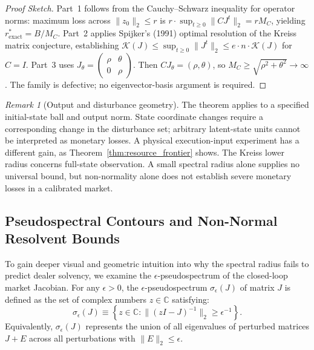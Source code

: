 \documentclass[12pt]{article}
\theoremstyle{definition}
\theoremstyle{remark}
\newtheorem{remark}[theorem]{Remark}
\begin{document}
\begin{proof}[Proof Sketch]
Part~1 follows from the Cauchy--Schwarz inequality for operator norms: maximum loss across $\|z_0\|_2 \le r$ is $r \cdot \sup_{t \ge 0} \|C J^t\|_2 = r M_C$, yielding $r^*_{\text{exact}} = B/M_C$. Part~2 applies Spijker's (1991) optimal resolution of the Kreiss matrix conjecture, establishing $\mathcal{K}(J) \le \sup_{t \ge 0} \|J^t\|_2 \le e \cdot n \cdot \mathcal{K}(J)$ for $C=I$. Part~3 uses $J_\theta=\left(\begin{smallmatrix}\rho&\theta\\0&\rho\end{smallmatrix}\right)$. Then $CJ_\theta=(\rho,\theta)$, so $M_C\ge\sqrt{\rho^2+\theta^2}\to\infty$. The family is defective; no eigenvector-basis argument is required.
\end{proof}

\begin{remark}[Output and disturbance geometry]
The theorem applies to a specified initial-state ball and output norm. State coordinate changes require a corresponding change in the disturbance set; arbitrary latent-state units cannot be interpreted as monetary losses. A physical execution-input experiment has a different gain, as Theorem~\ref{thm:resource_frontier} shows. The Kreiss lower radius concerns full-state observation. A small spectral radius alone supplies no universal bound, but non-normality alone does not establish severe monetary losses in a calibrated market.
\end{remark}

\subsection{Pseudospectral Contours and Non-Normal Resolvent Bounds}
To gain deeper visual and geometric intuition into why the spectral radius fails to predict dealer solvency, we examine the $\epsilon$-pseudospectrum of the closed-loop market Jacobian. For any $\epsilon > 0$, the $\epsilon$-pseudospectrum $\sigma_\epsilon(J)$ of matrix $J$ is defined as the set of complex numbers $z \in \mathbb{C}$ satisfying:
\begin{equation}
\sigma_\epsilon(J) \equiv \left\{ z \in \mathbb{C} : \|(zI - J)^{-1}\|_2 \ge \epsilon^{-1} \right\}.
\label{eq:pseudospectrum_def}
\end{equation}
Equivalently, $\sigma_\epsilon(J)$ represents the union of all eigenvalues of perturbed matrices $J + E$ across all perturbations with $\|E\|_2 \le \epsilon$.
\end{document}
